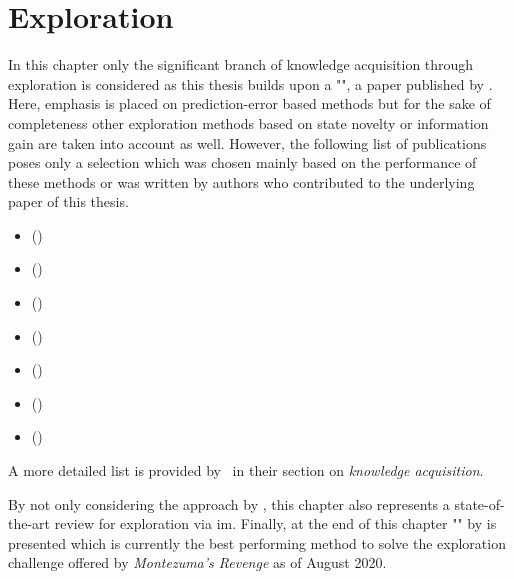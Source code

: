 \documentclass[draft,final]{vutinfth} %
\begin{document}
    \chapter{Exploration}\label{sec:state_of_the_art}
    In this chapter only the significant branch of knowledge acquisition through exploration is considered as this thesis builds upon a "", a paper published by \citet{burda_large-scale_2018-1}.
    Here, emphasis is placed on prediction-error based methods but for the sake of completeness other exploration methods based on state novelty or information gain are taken into account as well.
    However, the following list of publications poses only a selection which was chosen mainly based on the performance of these methods or was written by authors who contributed to the underlying paper of this thesis.

    \begin{itemize}
        \item {} (\citeauthor{stadie_incentivizing_2015})
        \item {} (\citeauthor{pathak_curiosity-driven_2017-1})
        \item {} (\citeauthor{kim_emi_2019})
        \item {} (\citeauthor{bellemare_unifying_2016})
        \item {} (\citeauthor{burda_exploration_2018})
        \item {} (\citeauthor{kim_emi_2019})
        \item {} (\citeauthor{pathak_self-supervised_2019})
    \end{itemize}

    A more detailed list is provided by~\citet[see Table 3]{aubret_survey_2019} in their section on \textit{knowledge acquisition}.

    By not only considering the approach by \citet{burda_large-scale_2018-1}, this chapter also represents a state-of-the-art review for exploration via \gls{im}.
    Finally, at the end of this chapter "" by \citet{ecoffet_go-explore_2019} is presented which is currently the best performing method to solve the exploration challenge offered by \textit{Montezuma's Revenge} as of August 2020.
\end{document}
